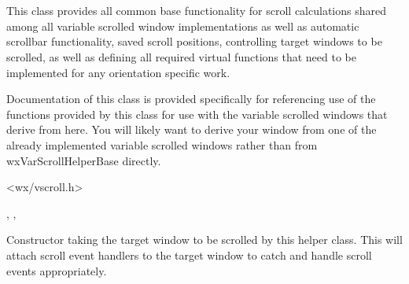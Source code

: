 
\section{}\label{wxvarscrollhelperbase}

This class provides all common base functionality for scroll calculations
shared among all variable scrolled window implementations as well as
automatic scrollbar functionality, saved scroll positions, controlling
target windows to be scrolled, as well as defining all required virtual
functions that need to be implemented for any orientation specific work.

Documentation of this class is provided specifically for referencing use
of the functions provided by this class for use with the variable scrolled
windows that derive from here. You will likely want to derive your window
from one of the already implemented variable scrolled windows rather than
from wxVarScrollHelperBase directly.


<wx/vscroll.h>




,
\rtfsp{},
\rtfsp{}



\label{wxvarscrollhelperbasewxvarscrollhelperbase}


Constructor taking the target window to be scrolled by this helper class.
This will attach scroll event handlers to the target window to catch and
handle scroll events appropriately.


\label{wxvarscrollhelperbasedtor}

